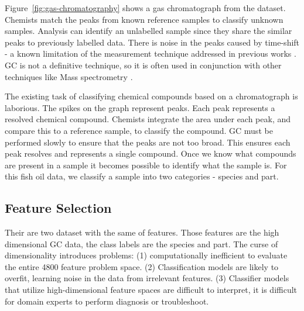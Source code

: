 \documentclass[runningheads]{llncs}
\begin{document}
Figure~\ref{fig:gas-chromatography} shows a gas chromatograph from the dataset. Chemists match the peaks from known reference samples to classify unknown samples. 
Analysis can identify an unlabelled sample since they share the similar peaks to previously labelled data.
There is noise in the peaks caused by time-shift - a known limitation of the measurement technique addressed in previous works \cite{tomasi2004correlation,zhang2008two}.
GC is not a definitive technique, so it is often used in conjunction with other techniques like Mass spectrometry \cite{restek2018high}.

The existing task \cite{eder1995gas,restek2018high} of classifying chemical compounds based on a chromatograph is laborious.
The spikes on the graph represent peaks.
Each peak represents a resolved chemical compound.
Chemists integrate the area under each peak, and compare this to a reference sample, to classify the compound.
GC must be performed slowly to ensure that the peaks are not too broad.
This ensures each peak resolves and represents a single compound.
Once we know what compounds are present in a sample it becomes possible to identify what the sample is.
For this fish oil data, we classify a sample into two categories - species and part. 

\subsection{Feature Selection}
\label{sec:background-feature-selection}


Their are two dataset with the same of features. 
Those features are the high dimensional GC data, the class labels are the species and part.
The curse of dimensionality \cite{koppen2000curse} introduces problems: (1) computationally inefficient to evaluate the entire 4800 feature problem space. (2) Classification models are likely to overfit, learning noise in the data from irrelevant features. (3) Classifier models that utilize high-dimensional feature spaces are difficult to interpret, it is difficult for domain experts to perform diagnosis or troubleshoot.
\end{document}
